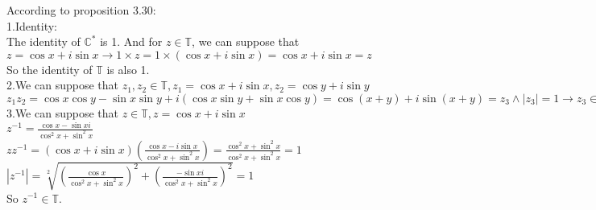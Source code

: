 \documentclass[a4paper, justified]{tufte-handout}
\begin{document}
\begin{solution}
	According to proposition 3.30:\\
	1.Identity:\\
	The identity of $\mathbb{C}^*$ is 1. And for $z\in \mathbb{T}$, we can suppose that $z = \cos x + i\sin x \rightarrow 1 \times z = 1 \times (\cos x + i\sin x)= \cos x + i\sin x = z$\\
	So the identity of $\mathbb{T}$ is also 1.\\
	2.We can suppose that $z_1, z_2\in \mathbb{T}, z_1 = \cos x + i\sin x, z_2 = \cos y + i\sin y$\\
	$z_1z_2 = \cos x\cos y -\sin x\sin y + i(\cos x \sin y +\sin x \cos y)=\cos(x+y)+i\sin(x+y) = z_3 \land |z_3|=1\rightarrow z_3 \in \mathbb{T}$\\
	3.We can suppose that $z\in \mathbb{T}, z = \cos x + i\sin x$\\
	$z^{-1}=\frac{\cos x-\sin xi}{\cos ^2x+\sin^2x}$\\
	$zz^{-1} = (\cos x + i\sin x)(\frac{\cos x-i\sin x}{\cos ^2x+\sin^2x}) = \frac{\cos ^2x+\sin^2x}{\cos ^2x+\sin^2x} = 1$\\
	$|z^{-1}| = \sqrt[2]{(\frac{\cos x}{\cos ^2x+\sin^2x})^2 + (\frac{-\sin xi}{\cos ^2x+\sin^2x})^2} = 1$\\
	So $z^{-1} \in \mathbb{T}$.
\end{solution}

\begin{problem}[TJ 3-42]
\end{problem}
\end{document}
